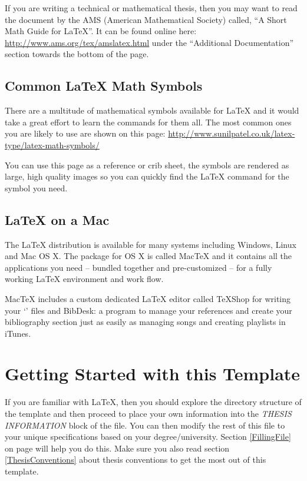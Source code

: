 If you are writing a technical or mathematical thesis, then you may want to read the document by the AMS (American Mathematical Society) called, \enquote{A Short Math Guide for \LaTeX{}}. It can be found online here:
\url{http://www.ams.org/tex/amslatex.html}
under the \enquote{Additional Documentation} section towards the bottom of the page.

\subsection{Common \LaTeX{} Math Symbols}
There are a multitude of mathematical symbols available for \LaTeX{} and it would take a great effort to learn the commands for them all. The most common ones you are likely to use are shown on this page:
\url{http://www.sunilpatel.co.uk/latex-type/latex-math-symbols/}

You can use this page as a reference or crib sheet, the symbols are rendered as large, high quality images so you can quickly find the \LaTeX{} command for the symbol you need.

\subsection{\LaTeX{} on a Mac}
 
The \LaTeX{} distribution is available for many systems including Windows, Linux and Mac OS X. The package for OS X is called MacTeX and it contains all the applications you need -- bundled together and pre-customized -- for a fully working \LaTeX{} environment and work flow.
 
MacTeX includes a custom dedicated \LaTeX{} editor called TeXShop for writing your `' files and BibDesk: a program to manage your references and create your bibliography section just as easily as managing songs and creating playlists in iTunes.


\section{Getting Started with this Template}

If you are familiar with \LaTeX{}, then you should explore the directory structure of the template and then proceed to place your own information into the \emph{THESIS INFORMATION} block of the  file. You can then modify the rest of this file to your unique specifications based on your degree/university. Section \ref{FillingFile} on page \pageref{FillingFile} will help you do this. Make sure you also read section \ref{ThesisConventions} about thesis conventions to get the most out of this template.


